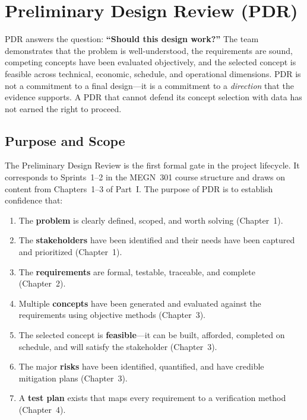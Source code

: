 \documentclass[11pt,letterpaper,twoside,openany]{book}
\begin{document}
\FloatBarrier
\chapter{Preliminary Design Review (PDR)}

\vspace{1em}

\begin{keyconceptbox}
PDR answers the question: \textbf{``Should this design work?''} The team demonstrates that the problem is well-understood, the requirements are sound, competing concepts have been evaluated objectively, and the selected concept is feasible across technical, economic, schedule, and operational dimensions. PDR is not a commitment to a final design---it is a commitment to a \emph{direction} that the evidence supports. A PDR that cannot defend its concept selection with data has not earned the right to proceed.
\end{keyconceptbox}

\vspace{1em}

\FloatBarrier
\section{Purpose and Scope}

The Preliminary Design Review is the first formal gate in the project lifecycle. It corresponds to Sprints~1--2 in the MEGN~301 course structure and draws on content from Chapters~1--3 of Part~I. The purpose of PDR is to establish confidence that:

\begin{enumerate}[leftmargin=1.5em]
\item The \textbf{problem} is clearly defined, scoped, and worth solving (Chapter~1).
\item The \textbf{stakeholders} have been identified and their needs have been captured and prioritized (Chapter~1).
\item The \textbf{requirements} are formal, testable, traceable, and complete (Chapter~2).
\item Multiple \textbf{concepts} have been generated and evaluated against the requirements using objective methods (Chapter~3).
\item The selected concept is \textbf{feasible}---it can be built, afforded, completed on schedule, and will satisfy the stakeholder (Chapter~3).
\item The major \textbf{risks} have been identified, quantified, and have credible mitigation plans (Chapter~3).
\item A \textbf{test plan} exists that maps every requirement to a verification method (Chapter~4).
\end{enumerate}
\end{document}
